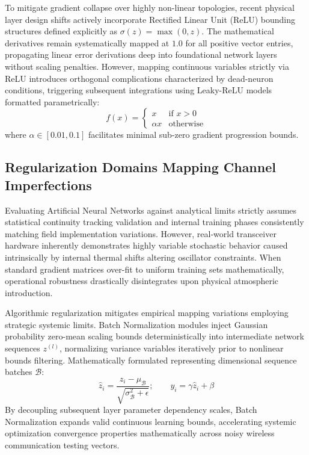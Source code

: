 \documentclass[a4paper,14pt]{extreport}
\begin{document}
To mitigate gradient collapse over highly non-linear topologies, recent physical layer design shifts actively incorporate Rectified Linear Unit (ReLU) bounding structures defined explicitly as $\sigma(z) = \max(0, z)$. The mathematical derivatives remain systematically mapped at $1.0$ for all positive vector entries, propagating linear error derivations deep into foundational network layers without scaling penalties. However, mapping continuous variables strictly via ReLU introduces orthogonal complications characterized by dead-neuron conditions, triggering subsequent integrations using Leaky-ReLU models formatted parametrically:
\begin{equation}
    f(x) = \begin{cases} 
      x & \text{if } x > 0 \\
      \alpha x & \text{otherwise} 
   \end{cases}
\end{equation}
where $\alpha \in [0.01, 0.1]$ facilitates minimal sub-zero gradient progression bounds.

\subsection{Regularization Domains Mapping Channel Imperfections}
Evaluating Artificial Neural Networks against analytical limits strictly assumes statistical continuity tracking validation and internal training phases consistently matching field implementation variations. However, real-world transceiver hardware inherently demonstrates highly variable stochastic behavior caused intrinsically by internal thermal shifts altering oscillator constraints. When standard gradient matrices over-fit to uniform training sets mathematically, operational robustness drastically disintegrates upon physical atmospheric introduction. 

Algorithmic regularization mitigates empirical mapping variations employing strategic systemic limits. Batch Normalization modules inject Gaussian probability zero-mean scaling bounds deterministically into intermediate network sequences $z^{(l)}$, normalizing variance variables iteratively prior to nonlinear bounds filtering. Mathematically formulated representing dimensional sequence batches $\mathcal{B}$:
\begin{equation}
    \hat{z}_{i} = \frac{z_{i} - \mu_{\mathcal{B}}}{\sqrt{\sigma_{\mathcal{B}}^2 + \epsilon}}; \quad \quad y_i = \gamma \hat{z}_{i} + \beta
\end{equation}
By decoupling subsequent layer parameter dependency scales, Batch Normalization expands valid continuous learning bounds, accelerating systemic optimization convergence properties mathematically across noisy wireless communication testing vectors.
\end{document}
